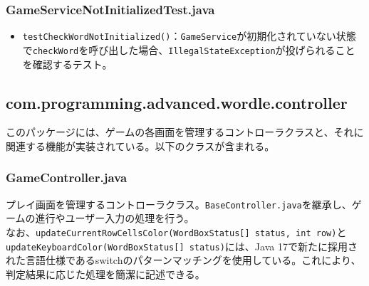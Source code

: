 \documentclass[a4j]{ujarticle}
\begin{document}
\subsubsection{GameServiceNotInitializedTest.java}

\begin{itemize}
  \item \texttt{testCheckWordNotInitialized()}：\texttt{GameService}が初期化されていない状態で\texttt{checkWord}を呼び出した場合、\texttt{IllegalStateException}が投げられることを確認するテスト。
\end{itemize}

\subsection{com.programming.advanced.wordle.controller}
このパッケージには、ゲームの各画面を管理するコントローラクラスと、それに関連する機能が実装されている。以下のクラスが含まれる。

\subsubsection{GameController.java}
プレイ画面を管理するコントローラクラス。\texttt{BaseController.java}を継承し、ゲームの進行やユーザー入力の処理を行う。\\
なお、\texttt{updateCurrentRowCellsColor(WordBoxStatus[] status, int row)}と \\ \texttt{updateKeyboardColor(WordBoxStatus[] status)}には、Java 17で新たに採用された言語仕様であるswitchのパターンマッチングを使用している。これにより、判定結果に応じた処理を簡潔に記述できる。
\end{document}
